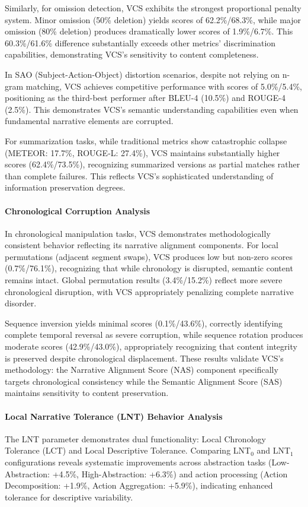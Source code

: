 \documentclass[main.tex]{subfiles}
\begin{document}
Similarly, for omission detection, VCS exhibits the strongest proportional penalty system. Minor omission (50\% deletion) yields scores of 62.2\%/68.3\%, while major omission (80\% deletion) produces dramatically lower scores of 1.9\%/6.7\%. This 60.3\%/61.6\% difference substantially exceeds other metrics' discrimination capabilities, demonstrating VCS's sensitivity to content completeness.

In SAO (Subject-Action-Object) distortion scenarios, despite not relying on n-gram matching, VCS achieves competitive performance with scores of 5.0\%/5.4\%, positioning as the third-best performer after BLEU-4 (10.5\%) and ROUGE-4 (2.5\%). This demonstrates VCS's semantic understanding capabilities even when fundamental narrative elements are corrupted.

For summarization tasks, while traditional metrics show catastrophic collapse (METEOR: 17.7\%, ROUGE-L: 27.4\%), VCS maintains substantially higher scores (62.4\%/73.5\%), recognizing summarized versions as partial matches rather than complete failures. This reflects VCS's sophisticated understanding of information preservation degrees.

\paragraph{Chronological Corruption Analysis}
In chronological manipulation tasks, VCS demonstrates methodologically consistent behavior reflecting its narrative alignment components. For local permutations (adjacent segment swaps), VCS produces low but non-zero scores (0.7\%/76.1\%), recognizing that while chronology is disrupted, semantic content remains intact. Global permutation results (3.4\%/15.2\%) reflect more severe chronological disruption, with VCS appropriately penalizing complete narrative disorder.

Sequence inversion yields minimal scores (0.1\%/43.6\%), correctly identifying complete temporal reversal as severe corruption, while sequence rotation produces moderate scores (42.9\%/43.0\%), appropriately recognizing that content integrity is preserved despite chronological displacement. These results validate VCS's methodology: the Narrative Alignment Score (NAS) component specifically targets chronological consistency while the Semantic Alignment Score (SAS) maintains sensitivity to content preservation.

\paragraph{Local Narrative Tolerance (LNT) Behavior Analysis}
The LNT parameter demonstrates dual functionality: Local Chronology Tolerance (LCT) and Local Descriptive Tolerance. Comparing LNT$_0$ and LNT$_1$ configurations reveals systematic improvements across abstraction tasks (Low-Abstraction: +4.5\%, High-Abstraction: +6.3\%) and action processing (Action Decomposition: +1.9\%, Action Aggregation: +5.9\%), indicating enhanced tolerance for descriptive variability.
\end{document}

